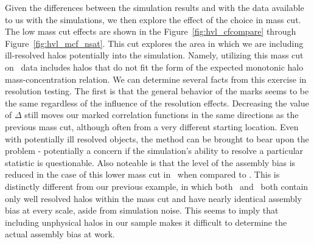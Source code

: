 \documentclass[usenatbib,usegraphicx,letterpaper]{mn2e}
\begin{document}
Given the differences between the simulation results and with the data available to us with the \citet{diemer15} simulations, we then explore the effect of the choice in mass cut. The low mass cut effects are shown in the Figure~\ref{fig:hvl_cfcompare} through Figure~\ref{fig:hvl_mcf_nsat}. This cut explores the area in which we are including ill-resolved halos potentially into the simulation. Namely, utilizing this mass cut on \simB \ data includes halos that do not fit the form of the expected monotonic halo mass-concentration relation. We can determine several facts from this exercise in resolution testing. The first is that the general behavior of the marks seems to be the same regardless of the influence of the resolution effects. Decreasing the value of $\Delta$ still moves our marked correlation functions in the same directions as the previous mass cut, although often from a very different starting location. Even with potentially ill resolved objects, the method can be brought to bear upon the problem - potentially a concern if the simulation's ability to resolve a particular statistic is questionable. Also noteable is that the level of the assembly bias is reduced in the case of this lower mass cut in \simB \ when compared to \simA. This is distinctly different from our previous example, in which both \simA \ and \simB \ both contain only well resolved halos within the mass cut and have nearly identical assembly bias at every scale, aside from simulation noise. This seems to imply that including unphysical halos in our sample makes it difficult to determine the actual assembly bias at work.
\end{document}

